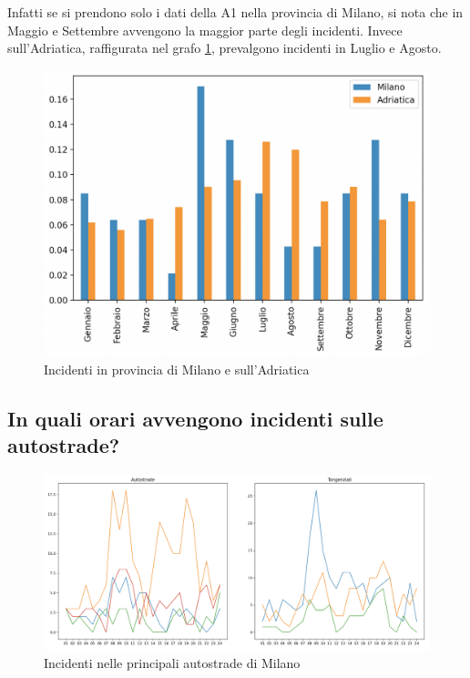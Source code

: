 \documentclass[a4paper]{report}
\begin{document}
Infatti se si prendono solo i dati della A1 nella provincia di Milano, si nota 
che in Maggio e Settembre avvengono la maggior parte degli incidenti.
Invece sull'Adriatica, raffigurata nel grafo \ref{fig:milano-adriatica}, 
prevalgono incidenti in Luglio e Agosto.
\begin{figure}
    \includegraphics[width=\linewidth]{../src/incidenti/incidenti_aci/autostrade/milano_adriatica.png}
    \caption{Incidenti in provincia di Milano e sull'Adriatica}
    \label{fig:milano-adriatica}
\end{figure}


\subsection{In quali orari avvengono incidenti sulle autostrade?}

\begin{figure}
    \includegraphics[width=\linewidth]{../src/incidenti/incidenti_aci/autostrade/tangenziali_autostrade.png}
    \caption{Incidenti nelle principali autostrade di Milano}
    \label{fig:tangenziali-autostrade}
\end{figure}
\end{document}
